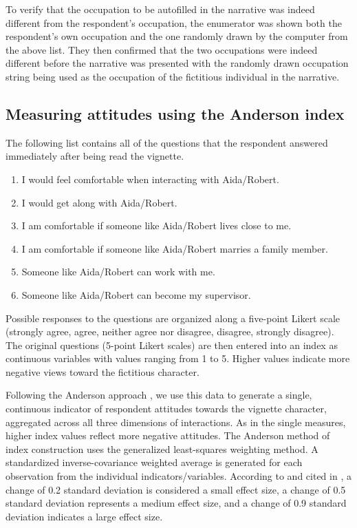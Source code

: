 \documentclass[a4paper,12pt]{article}
\begin{document}
\begin{appendix}
To verify that the occupation to be autofilled in the narrative was indeed different from the respondent's occupation, the enumerator was shown both the respondent's own occupation and the one randomly drawn by the computer from the above list. They then confirmed that the two occupations were indeed different before the narrative was presented with the randomly drawn occupation string being used as the occupation of the fictitious individual in the narrative. 
    
\subsection{Measuring attitudes using the Anderson index} \label{sec: Anderson desc}

 The following list contains all of the questions that the respondent answered immediately after being read the vignette.
 \begin{enumerate}
    \vspace{-0.2cm} \item I would feel comfortable when interacting with Aida/Robert.
    \vspace{-0.2cm} \item I would get along with Aida/Robert.
    \vspace{-0.2cm} \item I am comfortable if someone like Aida/Robert lives close to me.
    \vspace{-0.2cm} \item I am comfortable if someone like Aida/Robert marries a family member.
    \vspace{-0.2cm} \item Someone like Aida/Robert can work with me.
    \vspace{-0.2cm} \item Someone like Aida/Robert can become my supervisor. 
\end{enumerate}


Possible responses to the questions are organized along a five-point Likert scale (strongly agree, agree, neither agree nor disagree, disagree, strongly disagree). The original questions (5-point Likert scales) are then entered into an index as continuous variables with values ranging from 1 to 5. Higher values indicate more negative views toward the fictitious character. 

Following the Anderson approach \citep{anderson2008multiple}, we use this data to generate a single, continuous indicator of respondent attitudes towards the vignette character, aggregated across all three dimensions of interactions. As in the single measures, higher index values reflect more negative attitudes. The Anderson method of index construction uses the generalized least-squares weighting method. A standardized inverse-covariance weighted average is generated for each observation from the individual indicators/variables. According to \cite{muller1989statistical} and cited in \cite{schwab2020constructing}, a change of 0.2 standard deviation is considered a small effect size, a change of 0.5 standard deviation represents a medium effect size, and a change of 0.9 standard deviation indicates a large effect size. 


\end{appendix}
\end{document}
